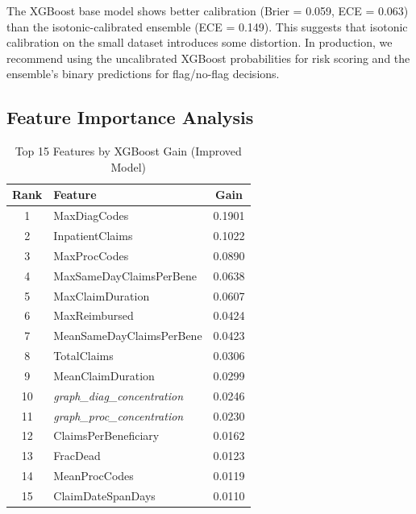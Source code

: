 \documentclass[conference]{IEEEtran}
\begin{document}
The XGBoost base model shows better calibration (Brier = 0.059, ECE = 0.063) than the isotonic-calibrated ensemble (ECE = 0.149). This suggests that isotonic calibration on the small dataset introduces some distortion. In production, we recommend using the uncalibrated XGBoost probabilities for risk scoring and the ensemble's binary predictions for flag/no-flag decisions.

\subsection{Feature Importance Analysis}

\begin{table}[h]
\caption{Top 15 Features by XGBoost Gain (Improved Model)}
\label{tab:importance}
\centering
\small
\begin{tabular}{@{}clc@{}}
\toprule
\textbf{Rank} & \textbf{Feature} & \textbf{Gain} \\
\midrule
1 & MaxDiagCodes & 0.1901 \\
2 & InpatientClaims & 0.1022 \\
3 & MaxProcCodes & 0.0890 \\
4 & MaxSameDayClaimsPerBene & 0.0638 \\
5 & MaxClaimDuration & 0.0607 \\
6 & MaxReimbursed & 0.0424 \\
7 & MeanSameDayClaimsPerBene & 0.0423 \\
8 & TotalClaims & 0.0306 \\
9 & MeanClaimDuration & 0.0299 \\
10 & \textit{graph\_diag\_concentration} & 0.0246 \\
11 & \textit{graph\_proc\_concentration} & 0.0230 \\
12 & ClaimsPerBeneficiary & 0.0162 \\
13 & FracDead & 0.0123 \\
14 & MeanProcCodes & 0.0119 \\
15 & ClaimDateSpanDays & 0.0110 \\
\bottomrule
\end{tabular}
\vspace{-1mm}
\end{table}
\end{document}
